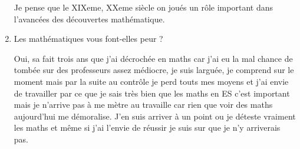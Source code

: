 \documentclass{article}
\begin{document}
\begin{enumerate}
    Je pense que le  XIXeme, XXeme siècle on joués un rôle important dans
    l'avancées des découvertes mathématique.
  \item Les mathématiques vous font-elles peur ?

    Oui, sa fait trois ans que j'ai décrochée en maths car j'ai eu la mal
    chance de tombée sur des professeurs assez médiocre, je suis larguée,
    je comprend sur le moment mais par la suite au contrôle je perd touts
    mes moyens et j'ai envie de travailler par ce que je sais très bien
    que les maths en ES c'est important mais je n'arrive pas à me mètre au
    travaille car rien que voir des maths aujourd'hui me démoralise. J'en
    suis arriver à un point ou je déteste vraiment les maths et même si
    j'ai l'envie de réussir je suis sur que je n'y arriverais pas. 
  \end{enumerate}
\end{document}
